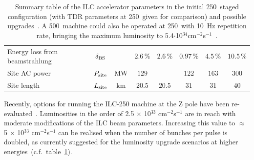 \begin{table}[tbhp]
\begin{adjustbox}{width=1.\textwidth,center=\textwidth}
\begin{tabular}{lccccccc}
Energy loss from beamstrahlung  & $\delta_{\mathrm{BS}}$ &  & $2.6\,\%$  & $2.6\,\%$  & $0.97\,\%$  & $4.5\,\%$ & $10.5\,\%$ \\
Site AC power  & $P_{\mathrm{{site}}}$ &  ${\mathrm{MW}}$ & $129$ & & $122$ & $163$ & $300$ \\
Site length & $L_{\mathrm{{site}}}$ &  ${\mathrm{km}}$ & $20.5$ & $20.5$ & $31$ & $31$ & $40$ \\
\end{tabular}
\caption{Summary table of the ILC accelerator parameters in the initial 250~\GeV staged configuration (with TDR parameters at 250~\GeV given for comparison) and possible upgrades~\cite{Bambade:2019fyw}. A 500~\GeV machine could also be operated at 250~\GeV with 10~Hz repetition rate, bringing the maximum luminosity to 5.4$\cdot$10$^{34}$cm$^{-2}$s$^{-1}$~\cite{Harrison:2013nva}.
\label{tab:ilc-params}}
\end{adjustbox}
\end{table}

Recently, options for running the ILC-250 machine at the Z pole have been re-evaluated~\cite{Yokoya:2019rhx}. Luminosities in the order of 2.5 $\times$ 10$^{33}$ cm$^{-2}$s$^{-1}$ are in reach with moderate modifications of the ILC beam parameters. Increasing this value to $\approx$ 5 $\times$ 10$^{33}$ cm$^{-2}$s$^{-1}$ can be realised when the number of bunches per pulse is doubled, as currently suggested for the luminosity upgrade scenarios at higher energies~(c.f.~table~\ref{tab:ilc-params}).

